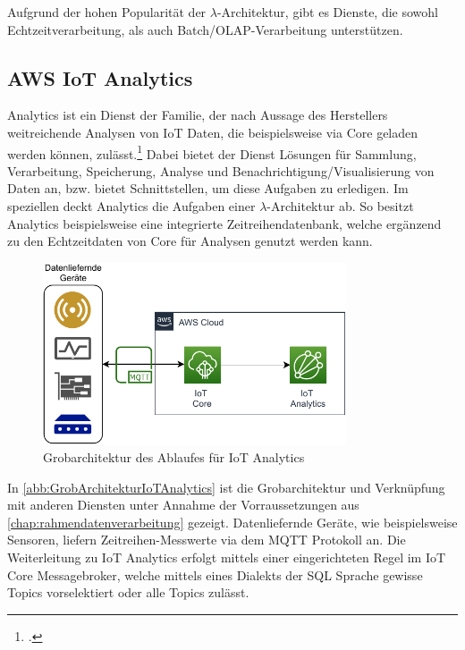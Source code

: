 Aufgrund der hohen Popularität der $\lambda$-Architektur, gibt es Dienste, die sowohl Echtzeitverarbeitung, als auch Batch/\ac{OLAP}-Verarbeitung unterstützen.

\subsection{AWS IoT Analytics} \label{productselection:iotanalytics}



\AWSIOT{} Analytics ist ein Dienst der \AWSIOT{} Familie, der nach Aussage des Herstellers weitreichende Analysen von \ac{IoT} Daten, die beispielsweise via \AWSIOT{} Core geladen werden können, zulässt.\footcite[Vgl. auch im Folgenden][]{AmazonWebServicesInc..o.J.c} Dabei bietet der Dienst Lösungen für Sammlung, Verarbeitung, Speicherung, Analyse und Benachrichtigung/Visualisierung von Daten an, bzw. bietet Schnittstellen, um diese Aufgaben zu erledigen. Im speziellen deckt \AWSIOT{} Analytics die Aufgaben einer $\lambda$-Architektur ab. So besitzt \AWSIOT{} Analytics beispielsweise eine integrierte Zeitreihendatenbank, welche ergänzend zu den Echtzeitdaten von \AWSIOT{} Core für Analysen genutzt werden kann.
\begin{figure}[H]
\centering
\includegraphics[width=0.8\textwidth]{graphics/IoT-Analytics-general.pdf}
\caption{Grobarchitektur des Ablaufes für IoT Analytics}
\label{abb:GrobArchitekturIoTAnalytics}
\end{figure}
In \autoref{abb:GrobArchitekturIoTAnalytics} ist die Grobarchitektur und Verknüpfung mit anderen Diensten unter Annahme der Vorraussetzungen aus \autoref{chap:rahmendatenverarbeitung} gezeigt. Datenliefernde Geräte, wie beispielsweise Sensoren, liefern Zeitreihen-Messwerte via dem \ac{MQTT} Protokoll an. Die Weiterleitung zu IoT Analytics erfolgt mittels einer eingerichteten Regel im \ac{IoT} Core Messagebroker, welche mittels eines Dialekts der \ac{SQL} Sprache gewisse Topics vorselektiert oder alle Topics zulässt.


